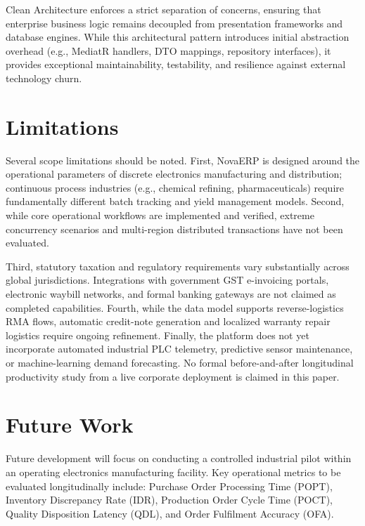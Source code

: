 \documentclass[conference]{IEEEtran}
\begin{document}
Clean Architecture enforces a strict separation of concerns, ensuring that enterprise business logic remains decoupled from presentation frameworks and database engines. While this architectural pattern introduces initial abstraction overhead (e.g., MediatR handlers, DTO mappings, repository interfaces), it provides exceptional maintainability, testability, and resilience against external technology churn.

\section{Limitations}
Several scope limitations should be noted. First, NovaERP is designed around the operational parameters of discrete electronics manufacturing and distribution; continuous process industries (e.g., chemical refining, pharmaceuticals) require fundamentally different batch tracking and yield management models. Second, while core operational workflows are implemented and verified, extreme concurrency scenarios and multi-region distributed transactions have not been evaluated.

Third, statutory taxation and regulatory requirements vary substantially across global jurisdictions. Integrations with government GST e-invoicing portals, electronic waybill networks, and formal banking gateways are not claimed as completed capabilities. Fourth, while the data model supports reverse-logistics RMA flows, automatic credit-note generation and localized warranty repair logistics require ongoing refinement. Finally, the platform does not yet incorporate automated industrial PLC telemetry, predictive sensor maintenance, or machine-learning demand forecasting. No formal before-and-after longitudinal productivity study from a live corporate deployment is claimed in this paper.

\section{Future Work}
Future development will focus on conducting a controlled industrial pilot within an operating electronics manufacturing facility. Key operational metrics to be evaluated longitudinally include: Purchase Order Processing Time (POPT), Inventory Discrepancy Rate (IDR), Production Order Cycle Time (POCT), Quality Disposition Latency (QDL), and Order Fulfilment Accuracy (OFA).
\end{document}
